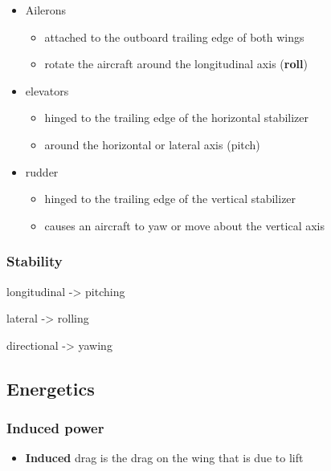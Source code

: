 \documentclass[]{article}
\begin{document}
\begin{itemize}
\item
  Ailerons

  \begin{itemize}
  \item
    attached to the outboard trailing edge of both wings
  \item
    rotate the aircraft around the longitudinal axis (\textbf{roll})
  \end{itemize}
\item
  elevators

  \begin{itemize}
  \item
    hinged to the trailing edge of the horizontal stabilizer
  \item
    around the horizontal or lateral axis (pitch)
  \end{itemize}
\item
  rudder

  \begin{itemize}
  \item
    hinged to the trailing edge of the vertical stabilizer
  \item
    causes an aircraft to yaw or move about the vertical axis
  \end{itemize}
\end{itemize}

\subsubsection{Stability}\label{header-n1173}

longitudinal -\textgreater{} pitching

lateral -\textgreater{} rolling

directional -\textgreater{} yawing

\subsection{Energetics}\label{header-n1177}

\subsubsection{Induced power}\label{header-n1178}

\begin{itemize}
\item
  \textbf{Induced} drag is the drag on the wing that is due to lift
\end{itemize}
\end{document}
